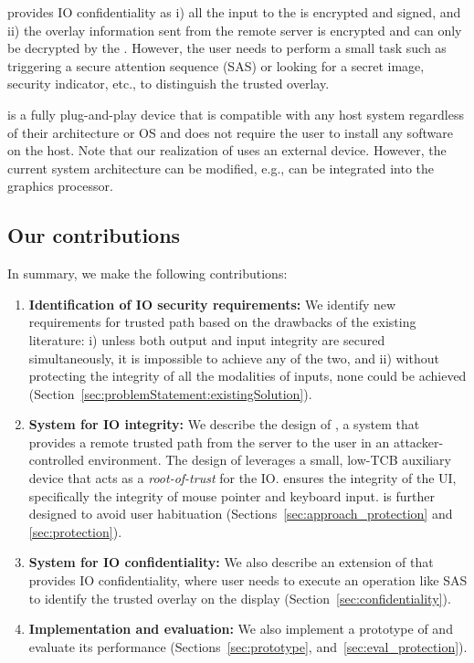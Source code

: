  \name provides IO confidentiality as i) all the input to the \device is encrypted and signed, and ii) the overlay information sent from the remote server is encrypted and can only be decrypted by the \device. However, the user needs to perform a small task such as triggering a secure attention sequence (SAS) or looking for a secret image, security indicator, etc., to distinguish the trusted overlay.


 \device is a fully plug-and-play device that is compatible with any host system regardless of their architecture or OS and does not require the user to install any software on the host. Note that our realization of \name uses an external device. However, the current system architecture can be modified, e.g., \device can be integrated into the graphics processor. 

\subsection{Our contributions} In summary, we make the following contributions:


\begin{enumerate}
  \item \textbf{Identification of IO security requirements:} We identify new requirements for trusted path based on the drawbacks of the existing literature: i) unless both output and input integrity are secured simultaneously, it is impossible to achieve any of the two, and ii) without protecting the integrity of all the modalities of inputs, none could be achieved (Section~\ref{sec:problemStatement:existingSolution}).
  
   
  \item \textbf{System for IO integrity:} We describe the design of \name, a system that provides a remote trusted path from the server to the user in an attacker-controlled environment. The design of \name leverages a small, low-TCB auxiliary device that acts as a \emph{root-of-trust} for the IO. \name ensures the integrity of the UI, specifically the integrity of mouse pointer and keyboard input. \name is further designed to avoid user habituation (Sections~\ref{sec:approach_protection} and \ref{sec:protection}).
  
  \item \textbf{System for IO confidentiality:} We also describe an extension of \name that provides IO confidentiality, where user needs to execute an operation like SAS to identify the trusted overlay on the display (Section~\ref{sec:confidentiality}).
  
   
  \item \textbf{Implementation and evaluation:} We also implement a prototype of \name and evaluate its performance (Sections~\ref{sec:prototype}, and~\ref{sec:eval_protection}).
\end{enumerate}



